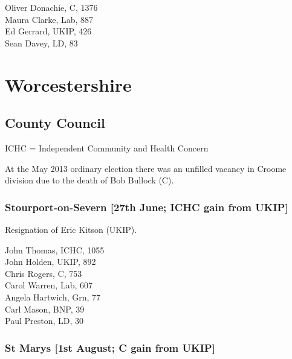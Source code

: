 \documentclass[a4paper,openany,10pt]{book}
\begin{document}
Oliver Donachie, C, 1376\\
Maura Clarke, Lab, 887\\
Ed Gerrard, UKIP, 426\\
Sean Davey, LD, 83\\


\vfill

\section[Worcestershire]{{Worcestershire}}

\subsection*{County Council}

ICHC = Independent Community and Health Concern

At the May 2013 ordinary election there was an unfilled vacancy in Croome division due to the death of Bob Bullock (C).


\subsubsection*{Stourport-on-Severn \hspace*{\fill}\nolinebreak[1]%
\enspace\hspace*{\fill}
[27th June; ICHC gain from UKIP]}


Resignation of Eric Kitson (UKIP).



John Thomas, ICHC, 1055\\
John Holden, UKIP, 892\\
Chris Rogers, C, 753\\
Carol Warren, Lab, 607\\
Angela Hartwich, Grn, 77\\
Carl Mason, BNP, 39\\
Paul Preston, LD, 30\\


\subsubsection*{St Marys \hspace*{\fill}\nolinebreak[1]%
\enspace\hspace*{\fill}
[1st August; C gain from UKIP]}
\end{document}
